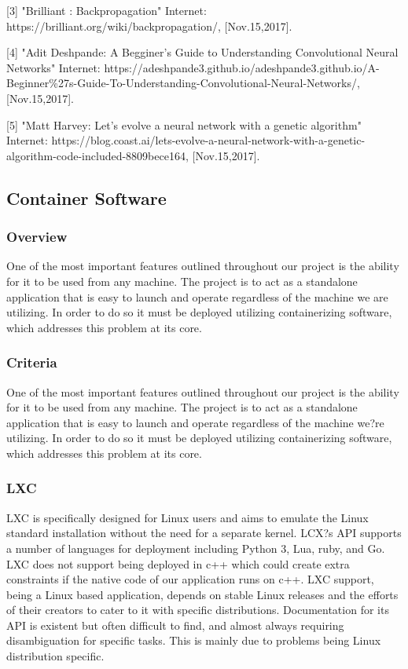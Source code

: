 \documentclass[article, onecolumn, draftclsnofoot,10pt, compsoc]{IEEEtran}
\begin{document}
[3] "Brilliant : Backpropagation" Internet: https://brilliant.org/wiki/backpropagation/, [Nov.15,2017].

[4] "Adit Deshpande: A Begginer's Guide to Understanding Convolutional Neural Networks" Internet: https://adeshpande3.github.io/adeshpande3.github.io/A-Beginner\%27s-Guide-To-Understanding-Convolutional-Neural-Networks/, [Nov.15,2017].

[5] "Matt Harvey: Let's evolve a neural network with a genetic algorithm" Internet: https://blog.coast.ai/lets-evolve-a-neural-network-with-a-genetic-algorithm-code-included-8809bece164, [Nov.15,2017].

\subsection{Container Software}
\subsubsection{Overview}
One of the most important features outlined throughout our project is the ability for it to be used from any machine. The project is to act as a standalone application that is easy to launch and operate regardless of the machine we are utilizing. In order to do so it must be deployed utilizing containerizing software, which addresses this problem at its core. 

\subsubsection{Criteria}
One of the most important features outlined throughout our project is the ability for it to be used from any machine. The project is to act as a standalone application that is easy to launch and operate regardless of the machine we?re utilizing. In order to do so it must be deployed utilizing containerizing software, which addresses this problem at its core. 

\subsubsection{LXC}
LXC is specifically designed for Linux users and aims to emulate the Linux standard installation without the need for a separate kernel.  LCX?s API supports a number of languages for deployment including Python 3, Lua, ruby, and Go. LXC does not support being deployed in c++ which could create extra constraints if the native code of our application runs on c++. LXC support, being a Linux based application, depends on stable Linux releases and the efforts of their creators to cater to it with specific distributions. Documentation for its API is existent but often difficult to find, and almost always requiring disambiguation for specific tasks. This is mainly due to problems being Linux distribution specific. 
\end{document}
